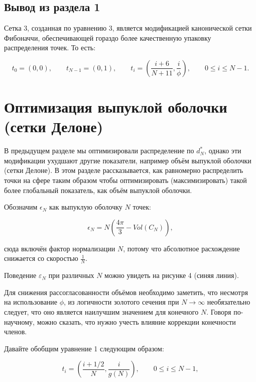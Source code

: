 \documentclass[12pt, a4paper]{article}
\begin{document}
\subsection{Вывод из раздела 1}

Сетка 3, созданная по уравнению 3, является модификацией канонической сетки Фибоначчи, обеспечивающей гораздо более качественную упаковку распределения точек. То есть:

\begin{displaymath}
    t_0 = (0, 0),
    \qquad
    t_{N-1} = (0, 1),
    \qquad
    t_i = \left( \frac{i + 6}{N + 11}, \frac{i}{\phi} \right),
    \qquad
    0 \leq i \leq N-1.
    \tag{3}
\end{displaymath}

\newpage

\section{Оптимизация выпуклой оболочки (сетки Делоне)}

В предыдущем разделе мы оптимизировали распределение по $d^*_N$, однако эти модификации ухудшают другие показатели, например объём выпуклой оболочки (сетки Делоне). В этом разделе рассказывается, как равномерно распределить точки на сфере таким образом чтобы оптимизировать (максимизировать) такой более глобальный показатель, как объём выпуклой оболочки.

Обозначим $\epsilon_N$ как выпуклую оболочку $N$ точек:

\begin{displaymath}
    \epsilon_N = N \left( \frac{4 \pi}{3} - Vol(C_N) \right),
\end{displaymath}

\noindent сюда включён фактор нормализации $N$, потому что абсолютное расхождение снижается со скоростью $\frac{1}{N}$.

Поведение $\varepsilon_N$ при различных $N$ можно увидеть на рисунке 4 (синяя линия).

Для снижения рассогласованности объёмов необходимо заметить, что несмотря на использование $\phi$, из логичности золотого сечения при $N \rightarrow \infty$ необязательно следует, что оно является наилучшим значением для конечного $N$. Говоря по-научному, можно сказать, что нужно учесть влияние коррекции конечности членов.

Давайте обобщим уравнение 1 следующим образом:

\begin{displaymath}
    t_i = \left( \frac{i+1/2}{N}, \frac{i}{g(N)} \right), \qquad 0 \leq i \leq N-1,
    \tag{4}
\end{displaymath}
\end{document}
